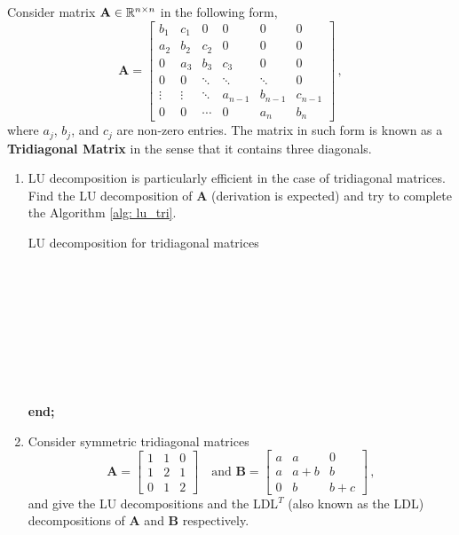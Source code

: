 \documentclass[english,onecolumn]{IEEEtran}
\begin{document}
\noindent Consider matrix ${\bf A} \in \mathbb{R}^{n\times n}$ in the following form,
\[
\mathbf{A} = 
\begin{bmatrix}
	b_1 & c_1 &  0  &  0 & 0  & 0 \\
	a_2 & b_2 & c_2 &  0 & 0  & 0 \\
	0   & a_3 & b_3 & c_3 & 0 & 0 \\
	0   & 0 & \ddots & \ddots& \ddots&0\\
	\vdots & \vdots & \ddots& a_{n-1}& b_{n-1}& c_{n-1}\\
	0 & 0 & \cdots & 0 & a_{n} & b_n 
\end{bmatrix}\,,
\]
where $a_j$, $b_j$, and $c_j$ are non-zero entries.
The matrix in such form is known as a \textbf{Tridiagonal Matrix} in the sense that it contains three diagonals.
\begin{enumerate}
	\item LU decomposition is particularly efficient in the case of tridiagonal matrices. Find the LU decomposition of $\mathbf{A}$ (derivation is expected) and try to complete the Algorithm \ref{alg: lu_tri}.
\begin{algorithm}[htbp]
\label{alg: lu_tri}
\caption{LU decomposition for tridiagonal matrices}
\SetAlgoLined
{}
\\
\\
\\
\\
\\
\\
\\
\\
\textbf{end;}
\end{algorithm}
\item
Consider symmetric tridiagonal matrices
\[
\mathbf{A} = \begin{bmatrix}
    1 & 1 & 0\\
    1 & 2 & 1 \\
    0 & 1 & 2 
\end{bmatrix}
\quad \text{and  }
\mathbf{B}= \begin{bmatrix}
    a & a & 0 \\
    a & a+b & b \\
    0 & b & b+c
\end{bmatrix}\,,
\]
and give the LU decompositions and the LDL$^T$ (also known as the LDL) decompositions of $\mathbf{A}$ and $\mathbf{B}$ respectively.
\end{enumerate}
\end{document}
